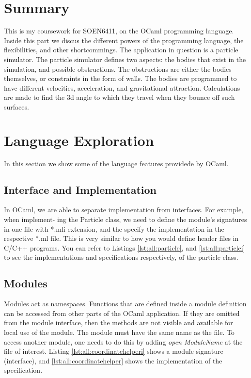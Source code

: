 \section{Summary}
This is my coursework for SOEN6411, on the OCaml programming language. Inside
this part we discus the different powers of the programming language, the
flexibilities, and other shortcommings.  The application in question is a
particle simulator. The particle simulator defines two aspects: the bodies that
exist in the simulation, and possible obstructions. The obstructions are either
the bodies themselves, or constraints in the form of walls. The bodies are
programmed to have different velocities, acceleration, and gravitational
attraction. Calculations are made to find the 3d angle to which they travel
when they bounce off such surfaces.

\section{Language Exploration}
In this section we show some of the language features providede by OCaml.

\subsection{Interface and Implementation}

In OCaml, we are able to separate implementation from interfaces. For example,
when implement- ing the Particle class, we need to define the module’s
signatures in one file with *.mli extension, and the specify the implementation
in the respective *.ml file. This is very similar to how you would define
header files in C/C++ programs. You can refer to Listings
\ref{lst:all:particle}, and \ref{lst:all:particlei} to see the implementations
and specifications respectively, of the particle class.

\subsection{Modules}

Modules act as namespaces. Functions that are defined inside a module
definition can be accessed from other parts of the OCaml application. If they
are omitted from the module interface, then the methods are not visible and
available for local use of the module. The module must have the same name as
the file. To access another module, one needs to do this by adding \textit{open
ModuleName} at the file of interest. Listing \ref{lst:all:coordinatehelperi}
shows a module signature (interface), and \ref{lst:all:coordinatehelper} shows
the implementation
of the specification.

